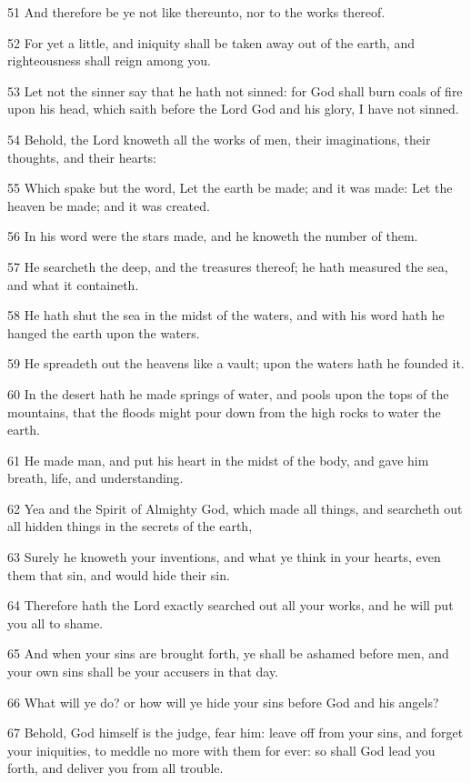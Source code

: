 \par 51 And therefore be ye not like thereunto, nor to the works thereof.
\par 52 For yet a little, and iniquity shall be taken away out of the earth, and righteousness shall reign among you.
\par 53 Let not the sinner say that he hath not sinned: for God shall burn coals of fire upon his head, which saith before the Lord God and his glory, I have not sinned.
\par 54 Behold, the Lord knoweth all the works of men, their imaginations, their thoughts, and their hearts:
\par 55 Which spake but the word, Let the earth be made; and it was made: Let the heaven be made; and it was created.
\par 56 In his word were the stars made, and he knoweth the number of them.
\par 57 He searcheth the deep, and the treasures thereof; he hath measured the sea, and what it containeth.
\par 58 He hath shut the sea in the midst of the waters, and with his word hath he hanged the earth upon the waters.
\par 59 He spreadeth out the heavens like a vault; upon the waters hath he founded it.
\par 60 In the desert hath he made springs of water, and pools upon the tops of the mountains, that the floods might pour down from the high rocks to water the earth.
\par 61 He made man, and put his heart in the midst of the body, and gave him breath, life, and understanding.
\par 62 Yea and the Spirit of Almighty God, which made all things, and searcheth out all hidden things in the secrets of the earth,
\par 63 Surely he knoweth your inventions, and what ye think in your hearts, even them that sin, and would hide their sin.
\par 64 Therefore hath the Lord exactly searched out all your works, and he will put you all to shame.
\par 65 And when your sins are brought forth, ye shall be ashamed before men, and your own sins shall be your accusers in that day.
\par 66 What will ye do? or how will ye hide your sins before God and his angels?
\par 67 Behold, God himself is the judge, fear him: leave off from your sins, and forget your iniquities, to meddle no more with them for ever: so shall God lead you forth, and deliver you from all trouble.
